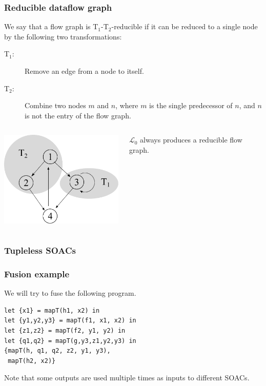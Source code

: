 \documentclass{beamer}
\newcommand{\LO}{$\mathcal{L}_0$}
\begin{document}
\begin{frame}
  \frametitle{Reducible dataflow graph}

  We say that a flow graph is T$_{1}$-T$_{2}$-reducible if it can be
  reduced to a single node by the following two transformations:

\begin{description}
  \item[T$_{1}$:] Remove an edge from a node to itself.

  \item[T$_{2}$:] Combine two nodes $m$ and $n$, where $m$ is the
    single predecessor of $n$, and $n$ is not the entry of the flow
    graph.
\end{description}

\begin{columns}
\begin{column}{6cm}
\includegraphics[width=6cm]{img/t1t2.pdf}\hfill
\end{column}
\begin{column}{4cm}
\LO{} always produces a reducible flow graph.
\end{column}
\end{columns}

\end{frame}

\begin{frame}
  \frametitle{Tupleless SOACs}
\end{frame}

\begin{frame}[fragile]
  \frametitle{Fusion example}

  We will try to fuse the following program.

  \begin{lstlisting}
let {x1} = mapT(h1, x2) in
let {y1,y2,y3} = mapT(f1, x1, x2) in
let {z1,z2} = mapT(f2, y1, y2) in
let {q1,q2} = mapT(g,y3,z1,y2,y3) in
{mapT(h, q1, q2, z2, y1, y3),
 mapT(h2, x2)}
\end{lstlisting}

Note that some outputs are used multiple times as inputs to different
SOACs.

\end{frame}
\end{document}
